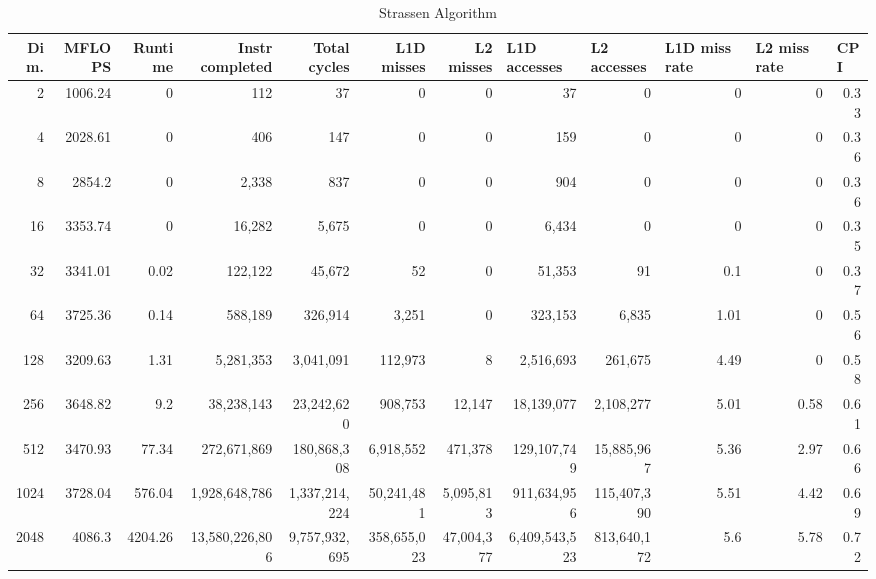 \documentclass{article}
\begin{document}
\begin{table}[htbp]
\tiny
\caption{Strassen Algorithm}
\begin{tabular}{|r|r|r|r|r|r|r|r|r|r|r|r|}
\hline
Dim. &   MFLOPS &     Runtime & Instr completed & Total cycles & L1D misses & L2 misses & \multicolumn{1}{l|}{L1D accesses} & \multicolumn{1}{l|}{ L2 accesses} & \multicolumn{1}{l|}{L1D miss rate} & \multicolumn{1}{l|}{L2 miss rate} & \multicolumn{1}{l|}{CPI} \\ \hline
2 & 1006.24 & 0 & 112 & 37 & 0 & 0 & 37 & 0 & 0 & 0 & 0.33 \\ \hline
4 & 2028.61 & 0 & 406 & 147 & 0 & 0 & 159 & 0 & 0 & 0 & 0.36 \\ \hline
8 & 2854.2 & 0 & 2,338 & 837 & 0 & 0 & 904 & 0 & 0 & 0 & 0.36 \\ \hline
16 & 3353.74 & 0 & 16,282 & 5,675 & 0 & 0 & 6,434 & 0 & 0 & 0 & 0.35 \\ \hline
32 & 3341.01 & 0.02 & 122,122 & 45,672 & 52 & 0 & 51,353 & 91 & 0.1 & 0 & 0.37 \\ \hline
64 & 3725.36 & 0.14 & 588,189 & 326,914 & 3,251 & 0 & 323,153 & 6,835 & 1.01 & 0 & 0.56 \\ \hline
128 & 3209.63 & 1.31 & 5,281,353 & 3,041,091 & 112,973 & 8 & 2,516,693 & 261,675 & 4.49 & 0 & 0.58 \\ \hline
256 & 3648.82 & 9.2 & 38,238,143 & 23,242,620 & 908,753 & 12,147 & 18,139,077 & 2,108,277 & 5.01 & 0.58 & 0.61 \\ \hline
512 & 3470.93 & 77.34 & 272,671,869 & 180,868,308 & 6,918,552 & 471,378 & 129,107,749 & 15,885,967 & 5.36 & 2.97 & 0.66 \\ \hline
1024 & 3728.04 & 576.04 & 1,928,648,786 & 1,337,214,224 & 50,241,481 & 5,095,813 & 911,634,956 & 115,407,390 & 5.51 & 4.42 & 0.69 \\ \hline
2048 & 4086.3 & 4204.26 & 13,580,226,806 & 9,757,932,695 & 358,655,023 & 47,004,377 & 6,409,543,523 & 813,640,172 & 5.6 & 5.78 & 0.72 \\ \hline
\end{tabular}
\label{}
\end{table}
\end{document}
